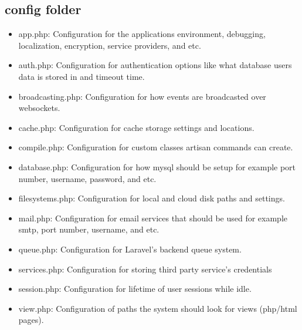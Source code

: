 \documentclass[11pt]{report}
\begin{document}
\subsection{config folder}
\begin{itemize}
    \item app.php: Configuration for the applications environment, debugging, localization, encryption, service providers, and etc.
    \item auth.php: Configuration for authentication options like what database users data is stored in and timeout time.
    \item broadcasting.php: Configuration for how events are broadcasted over websockets.
    \item cache.php: Configuration for cache storage settings and locations.
    \item compile.php: Configuration for custom classes artisan commands can create.
    \item database.php: Configuration for how mysql should be setup for example port number, username, password, and etc.
    \item filesystems.php: Configuration for local and cloud disk paths and settings.
    \item mail.php: Configuration for email services that should be used for example smtp, port number, username, and etc.
    \item queue.php: Configuration for Laravel's backend queue system.
    \item services.php: Configuration for storing third party service's credentials
    \item session.php: Configuration for lifetime of user sessions while idle.
    \item view.php: Configuration of paths the system should look for views (php/html pages).
\end{itemize}

\end{document}
